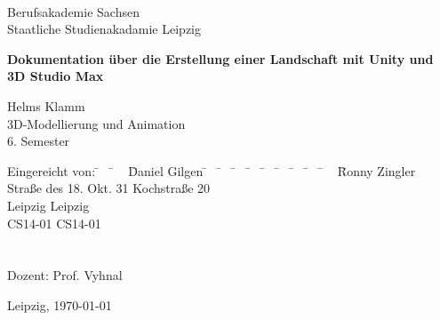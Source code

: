 	\begin{titlepage}
		
		\begin{center}
			~\\[0cm]
			Berufsakademie Sachsen \\
			Staatliche Studienakadamie Leipzig \\[2.0cm]
			
			\begin{huge}
				\textbf{Dokumentation über die Erstellung einer Landschaft mit Unity und \\3D Studio Max} \\[2.4cm]
			\end{huge}
			
			\doublespacing
			
			Helms Klamm\\
			3D-Modellierung und Animation\\ 
			6. Semester \\[3.0cm]
		\end{center}
		
		\onehalfspacing
		\begin{tabbing}
			Eingereicht von:  \= ~ \= ~ \= Daniel Gilgen \= ~ \= ~ \= ~ \= ~ \= ~ \= ~ \= ~ \= ~ \= ~ \= Ronny Zingler \\
			  \> \> \> Straße des 18. Okt. 31 	\> \> \> \> \> \> \> \> \> \> Kochstraße 20 \\
			  \> \>  Leipzig \> \> \> \> \> \> \> \> \>   Leipzig \\
			  \> \> \> CS14-01 	\> \> \> \> \> \> \> \> \> \>  CS14-01 \\
			  \> \>  \> \> \> \> \> \> \> \> \> \>  5000568 \\
			\\
			Dozent:  \> \> \> Prof. Vyhnal \\
		\end{tabbing}
		\vspace*{\fill}
		Leipzig, \today
		
	\end{titlepage}
